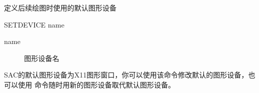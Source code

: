\label{cmd:setdevice}

定义后续绘图时使用的默认图形设备

\begin{SACSTX}
SETDEVICE name
\end{SACSTX}

\begin{description}
\item [name] 图形设备名
\end{description}

SAC的默认图形设备为X11图形窗口，你可以使用该命令修改默认的图形设备，也可以使用
 命令随时用新的图形设备取代默认图形设备。

